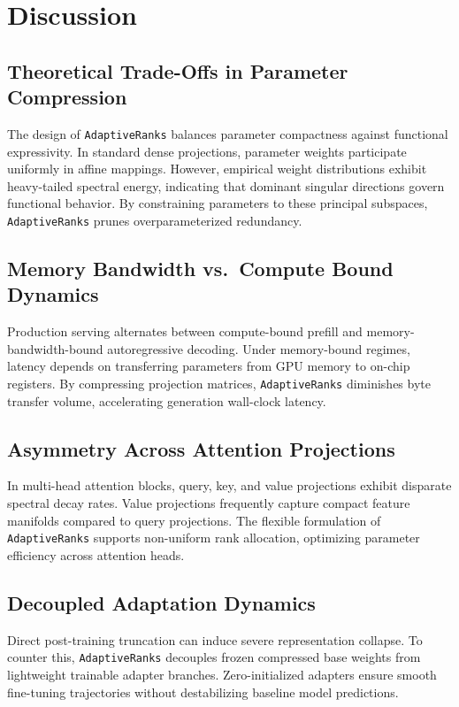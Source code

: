 \section{Discussion}

\subsection{Theoretical Trade-Offs in Parameter Compression}
The design of \texttt{AdaptiveRanks} balances parameter compactness against functional expressivity. In standard dense projections, parameter weights participate uniformly in affine mappings. However, empirical weight distributions exhibit heavy-tailed spectral energy, indicating that dominant singular directions govern functional behavior. By constraining parameters to these principal subspaces, \texttt{AdaptiveRanks} prunes overparameterized redundancy.

\subsection{Memory Bandwidth vs.\ Compute Bound Dynamics}
Production serving alternates between compute-bound prefill and memory-bandwidth-bound autoregressive decoding. Under memory-bound regimes, latency depends on transferring parameters from GPU memory to on-chip registers. By compressing projection matrices, \texttt{AdaptiveRanks} diminishes byte transfer volume, accelerating generation wall-clock latency.

\subsection{Asymmetry Across Attention Projections}
In multi-head attention blocks, query, key, and value projections exhibit disparate spectral decay rates. Value projections frequently capture compact feature manifolds compared to query projections. The flexible formulation of \texttt{AdaptiveRanks} supports non-uniform rank allocation, optimizing parameter efficiency across attention heads.

\subsection{Decoupled Adaptation Dynamics}
Direct post-training truncation can induce severe representation collapse. To counter this, \texttt{AdaptiveRanks} decouples frozen compressed base weights from lightweight trainable adapter branches. Zero-initialized adapters ensure smooth fine-tuning trajectories without destabilizing baseline model predictions.

